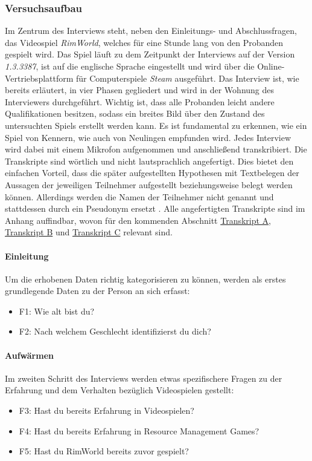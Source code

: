 \subsubsection{Versuchsaufbau}
Im Zentrum des Interviews steht, neben den Einleitungs- und Abschlussfragen, das Videospiel \textit{RimWorld}, welches für eine Stunde lang von den Probanden gespielt wird. Das Spiel läuft zu dem Zeitpunkt der Interviews auf der Version \textit{1.3.3387}, ist auf die englische Sprache eingestellt und wird über die Online-Vertriebsplattform für Computerspiele \textit{Steam} ausgeführt.
Das Interview ist, wie bereits erläutert, in vier Phasen gegliedert und wird in der Wohnung des Interviewers durchgeführt. Wichtig ist, dass alle Probanden leicht andere Qualifikationen besitzen, sodass ein breites Bild über den Zustand des untersuchten Spiels erstellt werden kann. Es ist fundamental zu erkennen, wie ein Spiel von Kennern, wie auch von Neulingen empfunden wird. Jedes Interview wird dabei mit einem Mikrofon aufgenommen und anschließend transkribiert. Die Transkripte sind wörtlich und nicht lautsprachlich angefertigt. Dies bietet den einfachen Vorteil, dass die später aufgestellten Hypothesen mit Textbelegen der Aussagen der jeweiligen Teilnehmer aufgestellt beziehungsweise belegt werden können. Allerdings werden die Namen der Teilnehmer nicht genannt und stattdessen durch ein Pseudonym ersetzt \cite*[S.97]{lankoski_bjork}. Alle angefertigten Transkripte sind im Anhang auffindbar, wovon für den kommenden Abschnitt \hyperref[transcript:A]{Transkript A}, \hyperref[transcript:B]{Transkript B} und \hyperref[transcript:C]{Transkript C} relevant sind.
 
\newpage
\paragraph {Einleitung}
Um die erhobenen Daten richtig kategorisieren zu können, werden als erstes grundlegende Daten zu der Person an sich erfasst:
\begin{itemize}
    \item F1: Wie alt bist du?
    \item F2: Nach welchem Geschlecht identifizierst du dich?
\end{itemize}

\paragraph{Aufwärmen}
Im zweiten Schritt des Interviews werden etwas spezifischere Fragen zu der Erfahrung und dem Verhalten bezüglich Videospielen gestellt:
\begin{itemize}
    \item F3: Hast du bereits Erfahrung in Videospielen?
    \item F4: Hast du bereits Erfahrung in Resource Management Games?
    \item F5: Hast du RimWorld bereits zuvor gespielt?
\end{itemize}


